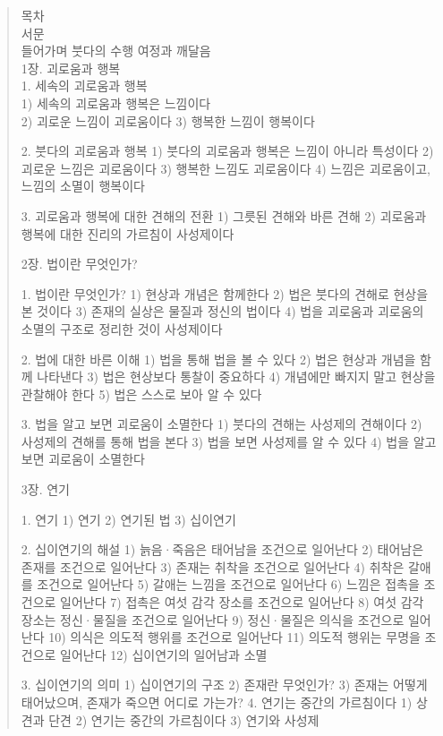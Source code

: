 \documentclass[12pt, a4paper, oneside]{book}
\begin{document}
\begin{quotation}

목차\\
서문\\
들어가며  붓다의 수행 여정과 깨달음\\

1장. 괴로움과 행복\\
1. 세속의 괴로움과 행복\\
1) 세속의 괴로움과 행복은 느낌이다\\
2) 괴로운 느낌이 괴로움이다
3) 행복한 느낌이 행복이다

2. 붓다의 괴로움과 행복
1) 붓다의 괴로움과 행복은 느낌이 아니라 특성이다
2) 괴로운 느낌은 괴로움이다
3) 행복한 느낌도 괴로움이다
4) 느낌은 괴로움이고, 느낌의 소멸이 행복이다

3. 괴로움과 행복에 대한 견해의 전환
1) 그릇된 견해와 바른 견해
2) 괴로움과 행복에 대한 진리의 가르침이 사성제이다

2장. 법이란 무엇인가?

1. 법이란 무엇인가?
1) 현상과 개념은 함께한다
2) 법은 붓다의 견해로 현상을 본 것이다
3) 존재의 실상은 물질과 정신의 법이다
4) 법을 괴로움과 괴로움의 소멸의 구조로 정리한 것이 사성제이다

2. 법에 대한 바른 이해
1) 법을 통해 법을 볼 수 있다
2) 법은 현상과 개념을 함께 나타낸다
3) 법은 현상보다 통찰이 중요하다
4) 개념에만 빠지지 말고 현상을 관찰해야 한다
5) 법은 스스로 보아 알 수 있다

3. 법을 알고 보면 괴로움이 소멸한다
1) 붓다의 견해는 사성제의 견해이다
2) 사성제의 견해를 통해 법을 본다
3) 법을 보면 사성제를 알 수 있다
4) 법을 알고 보면 괴로움이 소멸한다

3장. 연기

1. 연기
1) 연기
2) 연기된 법
3) 십이연기

2. 십이연기의 해설
1) 늙음·죽음은 태어남을 조건으로 일어난다
2) 태어남은 존재를 조건으로 일어난다
3) 존재는 취착을 조건으로 일어난다
4) 취착은 갈애를 조건으로 일어난다
5) 갈애는 느낌을 조건으로 일어난다
6) 느낌은 접촉을 조건으로 일어난다
7) 접촉은 여섯 감각 장소를 조건으로 일어난다
8) 여섯 감각 장소는 정신·물질을 조건으로 일어난다
9) 정신·물질은 의식을 조건으로 일어난다
10) 의식은 의도적 행위를 조건으로 일어난다
11) 의도적 행위는 무명을 조건으로 일어난다
12) 십이연기의 일어남과 소멸

3. 십이연기의 의미
1) 십이연기의 구조
2) 존재란 무엇인가?
3) 존재는 어떻게 태어났으며, 존재가 죽으면 어디로 가는가?
4. 연기는 중간의 가르침이다
1) 상견과 단견
2) 연기는 중간의 가르침이다
3) 연기와 사성제


\end{quotation}
\end{document}

